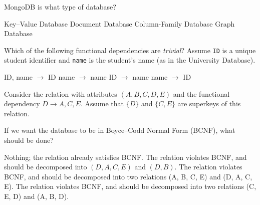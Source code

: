 \documentclass[12pt,answers]{exam}
\begin{document}
\begin{questions}
\begin{minipage}{\linewidth}
\question[2]
MongoDB is what type of database?

\begin{checkboxes}
    \choice Key–Value Database
    \CorrectChoice Document Database
    \choice Column-Family Database
    \choice Graph Database
\end{checkboxes}
\end{minipage}





\begin{minipage}{\linewidth}
\question
Which of the following functional dependencies are \emph{trivial}?  
Assume \texttt{ID} is a unique student identifier and \texttt{name} is the student’s name (as in the University Database).

\begin{checkboxes}
    \CorrectChoice ID, name $\to$ ID
    \CorrectChoice name $\to$ name
    \choice ID $\to$ name
    \choice name $\to$ ID
\end{checkboxes}
\end{minipage}




\begin{minipage}{\linewidth}
\question[4]
Consider the relation with attributes $(A, B, C, D, E)$ and the functional dependency $D \to A, C, E$.
Assume that $\{D\}$ and $\{C, E\}$ are superkeys of this relation.

If we want the database to be in Boyce--Codd Normal Form (BCNF), what should be done?

\begin{checkboxes}
    \CorrectChoice Nothing; the relation already satisfies BCNF.
    \choice The relation violates BCNF, and should be decomposed into $(D, A, C, E)$ and $(D, B)$.
    \choice The relation violates BCNF, and should be decomposed into two relations (A, B, C, E) and (D, A, C, E).
    \choice The relation violates BCNF, and should be decomposed into two relations (C, E, D) and (A, B, D).
\end{checkboxes}
\end{minipage}




\end{questions}
\end{document}
